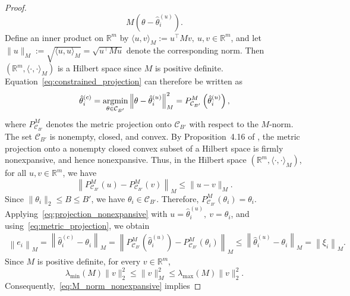 \begin{proof}
\begin{equation}
M
(\theta-\hat{\theta}_i^{(u)}).
\label{eq:constrained_projection}
\end{equation}
Define an inner product on $\mathbb R^m$ by 
$\langle u,v\rangle_M:=u^\top M v,\ u,v\in\mathbb R^m$,
and let 
$\|u\|_M:=\sqrt{\langle u,u\rangle_M}=\sqrt{u^\top Mu}$ denote the corresponding norm. Then $(\mathbb R^m,\langle\cdot,\cdot\rangle_M)$ is a Hilbert space since $M$ is positive definite. Equation~\eqref{eq:constrained_projection} can therefore be written as
\begin{equation}
\hat{\theta}_i^{(c)}
=\operatorname*{argmin}_{\theta\in \mathcal{C}_{B'}} 
\left\|
\theta-\hat{\theta}_i^{(u)}
\right\|_{M}^2
=
P_{\mathcal C_{B'}}^{M}
\left(
\hat{\theta}_i^{(u)}
\right),
\label{eq:metric_projection}
\end{equation}
where $P_{\mathcal C_{B'}}^{M}$ denotes the metric projection onto
$\mathcal C_{B'}$ with respect to the $M$-norm.\vspace{1em}\\
The set $\mathcal C_{B'}$ is nonempty, closed, and convex. By
Proposition~4.16 of \citet{bauschke2017convexity},
the metric projection onto a nonempty closed convex subset of a
Hilbert space is firmly nonexpansive, and hence nonexpansive. Thus,
in the Hilbert space
$(\mathbb R^m,\langle\cdot,\cdot\rangle_M)$, for all $u,v\in\mathbb R^m$, we have
\begin{equation}
\left\|
P_{\mathcal C_{B'}}^{M}(u)
-
P_{\mathcal C_{B'}}^{M}(v)
\right\|_M
\leq
\|u-v\|_M.
\label{eq:projection_nonexpansive}
\end{equation}
Since $\|\theta_i\|_2\leq B\leq B'$, we have
$\theta_i\in\mathcal C_{B'}$. Therefore, $P_{\mathcal C_{B'}}^{M}(\theta_i)=\theta_i$. Applying~\eqref{eq:projection_nonexpansive} with $u=\hat{\theta}_i^{(u)},\ v=\theta_i$, and using~\eqref{eq:metric_projection}, we obtain
\begin{align}
\left\|
e_i\right\|_M
=
\left\|
\hat{\theta}_i^{(c)}-\theta_i
\right\|_M
=
\left\|
P_{\mathcal C_{B'}}^{M}
\left(
\hat{\theta}_i^{(u)}
\right)
-
P_{\mathcal C_{B'}}^{M}(\theta_i)
\right\|_M
\leq
\left\|
\hat{\theta}_i^{(u)}-\theta_i
\right\|_M
=
\left\|
\xi_i\right\|_M.
\label{eq:M_norm_nonexpansive}
\end{align}
Since $M$ is positive definite, for every $v\in\mathbb R^m$,
\begin{equation}
\lambda_{\min}(M)\|v\|_2^2
\leq
\|v\|_M^2
\leq
\lambda_{\max}(M)\|v\|_2^2.
\label{eq: M_norm_to_l2}
\end{equation}
Consequently,~\eqref{eq:M_norm_nonexpansive} implies

\end{proof}
